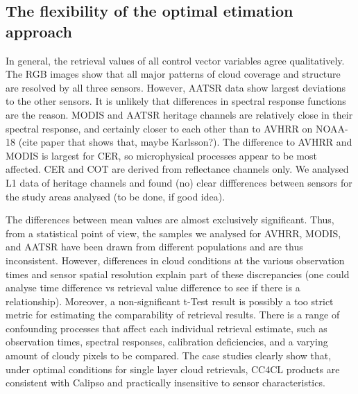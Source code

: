 \label{conclusions}

\subsection{The flexibility of the optimal etimation approach}


In general, the retrieval values of all control vector variables agree qualitatively. The RGB images show that all major patterns of cloud coverage and structure are resolved by all three sensors. However, AATSR data show largest deviations to the other sensors. It is unlikely that differences in spectral response functions are the reason. MODIS and AATSR heritage channels are relatively close in their spectral response, and certainly closer to each other than to AVHRR on NOAA-18 (cite paper that shows that, maybe Karlsson?). The difference to AVHRR and MODIS is largest for CER, so microphysical processes appear to be most affected. CER and COT are derived from reflectance channels only. We analysed L1 data of heritage channels and found (no) clear diffferences between sensors for the study areas analysed (to be done, if good idea).

The differences between mean values are almost exclusively significant. Thus, from a statistical point of view, the samples we analysed for AVHRR, MODIS, and AATSR have been drawn from different populations and are thus inconsistent. However, differences in cloud conditions at the various observation times and sensor spatial resolution explain part of these discrepancies (one could analyse time difference vs retrieval value difference to see if there is a relationship). Moreover, a non-significant t-Test result is possibly a too strict metric for estimating the comparability of retrieval results. There is a range of confounding processes that affect each individual retrieval estimate, such as observation times, spectral responses, calibration deficiencies, and a varying amount of cloudy pixels to be compared. The case studies clearly show that, under optimal conditions for single layer cloud retrievals, CC4CL products are consistent with Calipso and practically insensitive to sensor characteristics.

